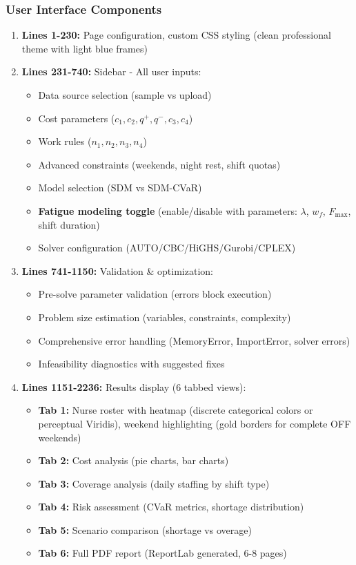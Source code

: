 \documentclass[11pt,letterpaper]{article}
\begin{document}
\subsubsection{User Interface Components}
\begin{enumerate}[leftmargin=*]
    \item \textbf{Lines 1-230:} Page configuration, custom CSS styling (clean professional theme with light blue frames)
    \item \textbf{Lines 231-740:} Sidebar - All user inputs:
    \begin{itemize}[leftmargin=*]
        \item Data source selection (sample vs upload)
        \item Cost parameters ($c_1, c_2, q^+, q^-, c_3, c_4$)
        \item Work rules ($n_1, n_2, n_3, n_4$)
        \item Advanced constraints (weekends, night rest, shift quotas)
        \item Model selection (SDM vs SDM-CVaR)
        \item \textbf{Fatigue modeling toggle} (enable/disable with parameters: $\lambda$, $w_f$, $F_{\max}$, shift duration)
        \item Solver configuration (AUTO/CBC/HiGHS/Gurobi/CPLEX)
    \end{itemize}
    \item \textbf{Lines 741-1150:} Validation \& optimization:
    \begin{itemize}[leftmargin=*]
        \item Pre-solve parameter validation (errors block execution)
        \item Problem size estimation (variables, constraints, complexity)
        \item Comprehensive error handling (MemoryError, ImportError, solver errors)
        \item Infeasibility diagnostics with suggested fixes
    \end{itemize}
    \item \textbf{Lines 1151-2236:} Results display (6 tabbed views):
    \begin{itemize}[leftmargin=*]
        \item \textbf{Tab 1:} Nurse roster with heatmap (discrete categorical colors or perceptual Viridis), weekend highlighting (gold borders for complete OFF weekends)
        \item \textbf{Tab 2:} Cost analysis (pie charts, bar charts)
        \item \textbf{Tab 3:} Coverage analysis (daily staffing by shift type)
        \item \textbf{Tab 4:} Risk assessment (CVaR metrics, shortage distribution)
        \item \textbf{Tab 5:} Scenario comparison (shortage vs overage)
        \item \textbf{Tab 6:} Full PDF report (ReportLab generated, 6-8 pages)
    \end{itemize}
\end{enumerate}
\end{document}
